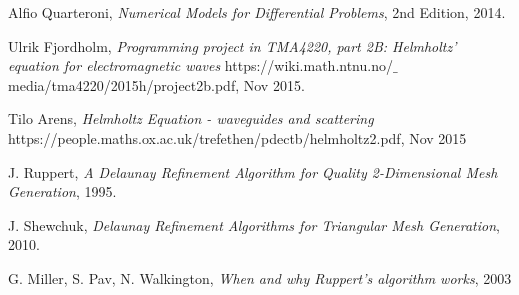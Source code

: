 \documentclass[10pt,a4paper]{article}
\begin{document}
\begin{thebibliography}{}

Alfio Quarteroni, \emph{Numerical Models for Differential Problems}, 2nd Edition, 2014.

Ulrik Fjordholm, \emph{Programming project in TMA4220, part 2B:
Helmholtz' equation for electromagnetic waves} https://wiki.math.ntnu.no/$\_$media/tma4220/2015h/project2b.pdf, Nov 2015.

Tilo Arens, \emph{Helmholtz Equation - waveguides and scattering} https://people.maths.ox.ac.uk/trefethen/pdectb/helmholtz2.pdf, Nov 2015

J. Ruppert, \emph{A Delaunay Refinement Algorithm for Quality 2-Dimensional Mesh Generation}, 1995.

J. Shewchuk, \emph{Delaunay Refinement Algorithms for Triangular Mesh Generation}, 2010.

G. Miller, S. Pav, N. Walkington, \emph{When and why Ruppert's algorithm works}, 2003


\end{thebibliography}
\end{document}
